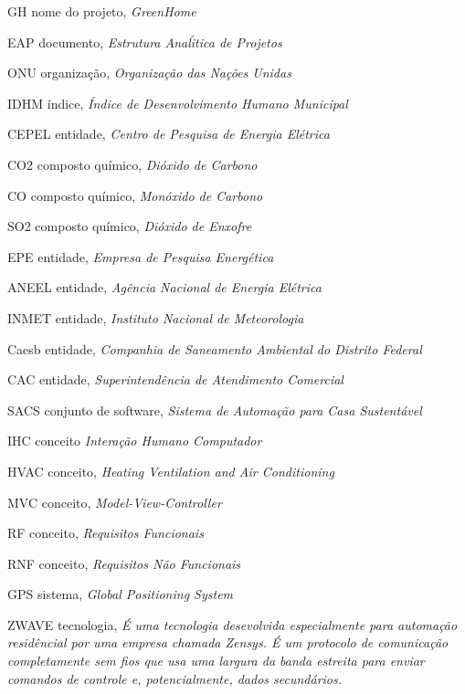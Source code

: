 \begin{siglas}
  \item[GH] nome do projeto, \textit{GreenHome}
  \item[EAP] documento, \textit{Estrutura Ana\'litica de Projetos}
  \item[ONU] organização, \textit{Organização das Nações Unidas}
  \item[IDHM] índice, \textit{Índice de Desenvolvimento Humano Municipal}
  \item[CEPEL] entidade, \textit{Centro de Pesquisa de Energia Elétrica}
  \item[CO2] composto químico, \textit{Dióxido de Carbono}
  \item[CO] composto químico, \textit{Monóxido de Carbono}
  \item[SO2] composto químico, \textit{Dióxido de Enxofre}
  \item[EPE] entidade, \textit{Empresa de Pesquisa Energética}
  \item[ANEEL] entidade, \textit{Agência Nacional de Energia Elétrica}
  \item[INMET] entidade, \textit{Instituto Nacional de Meteorologia}
  \item[Caesb] entidade, \textit{Companhia de Saneamento Ambiental do Distrito Federal}
  \item[CAC] entidade, \textit{Superintendência de Atendimento Comercial}
  \item[SACS] conjunto de software, \textit{Sistema de Automação para Casa Sustentável}
  \item[IHC] conceito \textit{Interação Humano Computador}
  \item[HVAC] conceito, \textit{Heating Ventilation and Air Conditioning}
  \item[MVC] conceito, \textit{Model-View-Controller}
  \item[RF] conceito, \textit{Requisitos Funcionais}
  \item[RNF] conceito, \textit{Requisitos Não Funcionais}
  \item[GPS] sistema, \textit{Global Positioning System}
  \item[ZWAVE] tecnologia, \textit{É uma tecnologia desevolvida especialmente para automação residêncial por uma empresa chamada Zensys. É um protocolo de comunicação completamente sem fios que usa uma largura da banda estreita para enviar comandos de controle e, potencialmente, dados secundários.}
\end{siglas}
